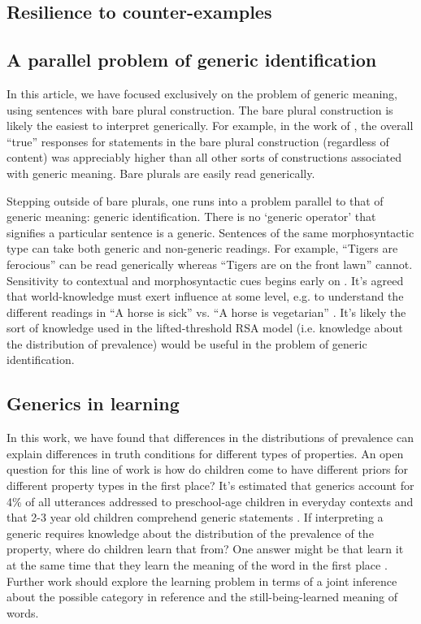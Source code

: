 \documentclass[10pt,letterpaper]{article}
\begin{document}
\subsection{Resilience to counter-examples}

\subsection{A parallel problem of generic identification}

In this article, we have focused exclusively on the problem of generic meaning, using sentences with bare plural construction. The bare plural construction is likely the easiest to interpret generically. For example, in the work of , the overall ``true'' responses for statements in the bare plural construction (regardless of content) was appreciably higher than all other sorts of constructions associated with generic meaning. Bare plurals are easily read generically. 

Stepping outside of bare plurals, one runs into a problem parallel to that of generic meaning: generic identification. There is no `generic operator' that signifies a particular sentence is a generic. Sentences of the same morphosyntactic type can take both generic and non-generic readings. For example, ``Tigers are ferocious'' can be read generically whereas ``Tigers are on the front lawn'' cannot. Sensitivity to contextual and morphosyntactic cues begins early on \cite{Cimpian2008}. It's agreed that world-knowledge must exert influence at some level, e.g. to understand the different readings in ``A horse is sick'' vs. ``A horse is vegetarian'' \cite{Gelman2004}. It's likely the sort of knowledge used in the lifted-threshold RSA model (i.e. knowledge about the distribution of prevalence) would be useful in the problem of generic identification. 

\subsection{Generics in learning}

In this work, we have found that differences in the distributions of prevalence can explain differences in truth conditions for different types of properties. An open question for this line of work is how do children come to have different priors for different property types in the first place? It's estimated that generics account for 4\% of all utterances addressed to preschool-age children in everyday contexts \cite{Gelman2008} and that 2-3 year old children comprehend generic statements \cite{Cimpian2011, Gelman2003}. If interpreting a generic requires knowledge about the distribution of the prevalence of the property, where do children learn that from? One answer might be that learn it at the same time that they learn the meaning of the word in the first place \cite{Frank2009}. Further work should explore the learning problem in terms of a joint inference about the possible category in reference and the still-being-learned meaning of words. 
 
\end{document}
